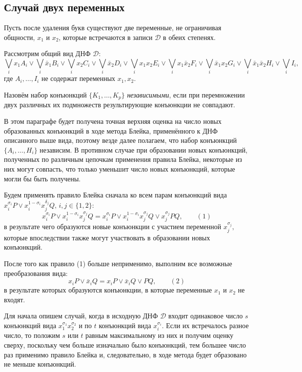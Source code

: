 \documentclass[12pt,a4paper,oneside,fleqn,leqno]{article}
\theoremstyle{definition}
\begin{document}
\subsection{Случай двух переменных}
			Пусть после удаления букв существуют две переменные, не ограничивая общности, $x_1$ и $x_2$, которые встречаются в записи $\mathcal{D}$ в обеих степенях.\par
			Рассмотрим общий вид ДНФ $\mathcal{D}$:
			$$
				\bigvee_ix_1A_i \vee \bigvee_i\bar{x}_1B_i \vee \bigvee_ix_2C_i \vee \bigvee_i\bar{x}_2D_i \vee \bigvee_ix_1x_2E_i \vee \bigvee_ix_1\bar{x}_2F_i \vee \bigvee_i\bar{x}_1x_2G_i \vee \bigvee_i\bar{x}_1\bar{x}_2H_i \vee \bigvee_iI_i,
			$$
			где $A_i, \ldots, I_i$ не содержат переменных $x_1, x_2.$\par
			Назовём набор конъюнкций $\{K_1, \ldots, K_p\}$ {\it независимыми}, если при перемножении двух различных их подмножеств результирующие конъюнкции не совпадают.\par
			В этом параграфе будет получена точная верхняя оценка на число новых образованных конъюнкций в ходе метода Блейка, применённого к ДНФ описанного выше вида, поэтому везде далее полагаем, что набор конъюнкций $\{A_i, \ldots, H_i\}$ независим. В противном случае при образовании новых конъюнкций, полученных по различным цепочкам применения правила Блейка, некоторые из них могут совпасть, что только уменьшит число новых конъюнкций, которые могли бы быть получены. \par
			Будем применять правило Блейка сначала ко всем парам конъюнкций вида\\$x_i^{\sigma_i}P \vee x_i^{1-\sigma_i}x_j^{\delta_j}Q,\, i,j\in\{1, 2\}$:
			$$
				x_i^{\sigma_i}P \vee x_i^{1-\sigma_i}x_j^{\sigma_j}Q = x_i^{\sigma_i}P \vee x_i^{1-\sigma_i}x_j^{\sigma_j}Q \vee x_j^{\sigma_j}PQ,\qquad(1)
			$$
			в результате чего образуются новые конъюнкции с участием переменной $x_j^{\sigma_j},$ которые впоследствии также могут участвовать в образовании новых конъюнкций.\par
			После того как правило (1) больше неприменимо, выполним все возможные преобразования вида:
			$$
				x_iP \vee \bar{x}_iQ = x_iP \vee \bar{x}_iQ \vee PQ,\qquad(2)
			$$
			в результате которых образуются конъюнкции, в которые переменные $x_1$ и $x_2$ не входят.\par
			Для начала опишем случай, когда в исходную ДНФ $\mathcal{D}$ входит одинаковое число $s$ конъюнкций вида $x_1^{\sigma_1}x_2^{\sigma_2}$ и по $t$ конъюнкций вида $x_i^{\sigma_i}$. Если их встречалось разное число, то положим $s$ или $t$ равным максимальному из них и получим оценку сверху, поскольку чем больше изначально было конъюнкций, тем большее число раз применимо правило Блейка и, следовательно, в ходе метода будет образовано не меньше конъюнкций.\par
\end{document}
